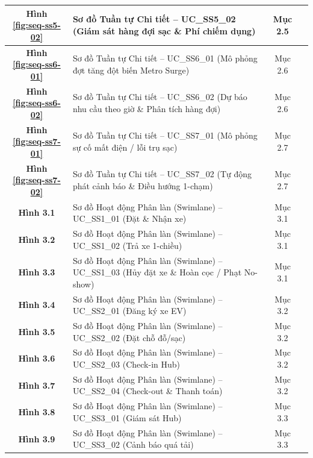 \documentclass[12pt,a4paper]{article}
\begin{document}
\begin{longtable}{|c|p{8.5cm}|c|c|}
    \hline
    \textbf{Hình \ref{fig:seq-ss5-02}} & Sơ đồ Tuần tự Chi tiết -- UC\_SS5\_02 (Giám sát hàng đợi sạc \& Phí chiếm dụng) & Mục 2.5 & \pageref{fig:seq-ss5-02} \\
    \hline
    \textbf{Hình \ref{fig:seq-ss6-01}} & Sơ đồ Tuần tự Chi tiết -- UC\_SS6\_01 (Mô phỏng đợt tăng đột biến Metro Surge) & Mục 2.6 & \pageref{fig:seq-ss6-01} \\
    \hline
    \textbf{Hình \ref{fig:seq-ss6-02}} & Sơ đồ Tuần tự Chi tiết -- UC\_SS6\_02 (Dự báo nhu cầu theo giờ \& Phân tích hàng đợi) & Mục 2.6 & \pageref{fig:seq-ss6-02} \\
    \hline
    \textbf{Hình \ref{fig:seq-ss7-01}} & Sơ đồ Tuần tự Chi tiết -- UC\_SS7\_01 (Mô phỏng sự cố mất điện / lỗi trụ sạc) & Mục 2.7 & \pageref{fig:seq-ss7-01} \\
    \hline
    \textbf{Hình \ref{fig:seq-ss7-02}} & Sơ đồ Tuần tự Chi tiết -- UC\_SS7\_02 (Tự động phát cảnh báo \& Điều hướng 1-chạm) & Mục 2.7 & \pageref{fig:seq-ss7-02} \\
    \hline
    \textbf{Hình 3.1} & Sơ đồ Hoạt động Phân làn (Swimlane) -- UC\_SS1\_01 (Đặt \& Nhận xe) & Mục 3.1 & \pageref{fig:act-ss1-01} \\
    \hline
    \textbf{Hình 3.2} & Sơ đồ Hoạt động Phân làn (Swimlane) -- UC\_SS1\_02 (Trả xe 1-chiều) & Mục 3.1 & \pageref{fig:act-ss1-02} \\
    \hline
    \textbf{Hình 3.3} & Sơ đồ Hoạt động Phân làn (Swimlane) -- UC\_SS1\_03 (Hủy đặt xe \& Hoàn cọc / Phạt No-show) & Mục 3.1 & \pageref{fig:act-ss1-03} \\
    \hline
    \textbf{Hình 3.4} & Sơ đồ Hoạt động Phân làn (Swimlane) -- UC\_SS2\_01 (Đăng ký xe EV) & Mục 3.2 & \pageref{fig:act-ss2-01} \\
    \hline
    \textbf{Hình 3.5} & Sơ đồ Hoạt động Phân làn (Swimlane) -- UC\_SS2\_02 (Đặt chỗ đỗ/sạc) & Mục 3.2 & \pageref{fig:act-ss2-02} \\
    \hline
    \textbf{Hình 3.6} & Sơ đồ Hoạt động Phân làn (Swimlane) -- UC\_SS2\_03 (Check-in Hub) & Mục 3.2 & \pageref{fig:act-ss2-03} \\
    \hline
    \textbf{Hình 3.7} & Sơ đồ Hoạt động Phân làn (Swimlane) -- UC\_SS2\_04 (Check-out \& Thanh toán) & Mục 3.2 & \pageref{fig:act-ss2-04} \\
    \hline
    \textbf{Hình 3.8} & Sơ đồ Hoạt động Phân làn (Swimlane) -- UC\_SS3\_01 (Giám sát Hub) & Mục 3.3 & \pageref{fig:act-ss3-01} \\
    \hline
    \textbf{Hình 3.9} & Sơ đồ Hoạt động Phân làn (Swimlane) -- UC\_SS3\_02 (Cảnh báo quá tải) & Mục 3.3 & \pageref{fig:act-ss3-02} \\

\end{longtable}
\end{document}
